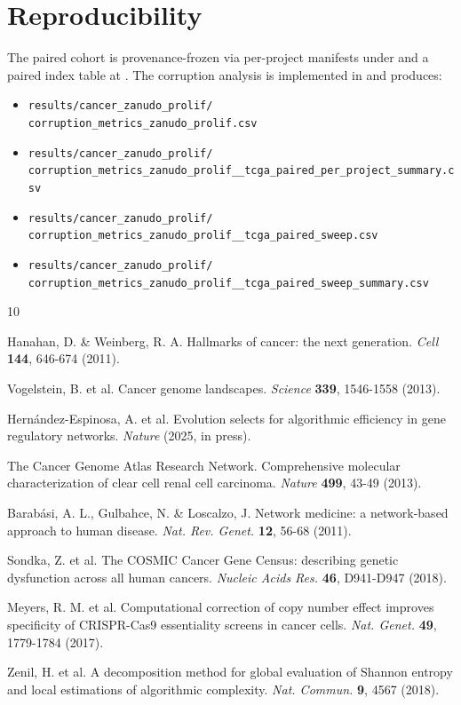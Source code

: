 \documentclass[11pt]{article}
\begin{document}
\section*{Reproducibility}

The paired cohort is provenance-frozen via per-project manifests under  and a paired index table at . The corruption analysis is implemented in  and produces:
\begin{itemize}
    \item \texttt{results/cancer\_zanudo\_prolif/}\\\texttt{corruption\_metrics\_zanudo\_prolif.csv}
    \item \texttt{results/cancer\_zanudo\_prolif/}\\\texttt{corruption\_metrics\_zanudo\_prolif\_\_tcga\_paired\_per\_project\_summary.csv}
    \item \texttt{results/cancer\_zanudo\_prolif/}\\\texttt{corruption\_metrics\_zanudo\_prolif\_\_tcga\_paired\_sweep.csv}
    \item \texttt{results/cancer\_zanudo\_prolif/}\\\texttt{corruption\_metrics\_zanudo\_prolif\_\_tcga\_paired\_sweep\_summary.csv}
\end{itemize}

\begin{thebibliography}{10}

Hanahan, D. \& Weinberg, R. A.
Hallmarks of cancer: the next generation.
\textit{Cell} \textbf{144}, 646-674 (2011).

Vogelstein, B. et al.
Cancer genome landscapes.
\textit{Science} \textbf{339}, 1546-1558 (2013).

Hernández-Espinosa, A. et al.
Evolution selects for algorithmic efficiency in gene regulatory networks.
\textit{Nature} (2025, in press).

The Cancer Genome Atlas Research Network.
Comprehensive molecular characterization of clear cell renal cell carcinoma.
\textit{Nature} \textbf{499}, 43-49 (2013).

Barabási, A. L., Gulbahce, N. \& Loscalzo, J.
Network medicine: a network-based approach to human disease.
\textit{Nat. Rev. Genet.} \textbf{12}, 56-68 (2011).

Sondka, Z. et al.
The COSMIC Cancer Gene Census: describing genetic dysfunction across all human cancers.
\textit{Nucleic Acids Res.} \textbf{46}, D941-D947 (2018).

Meyers, R. M. et al.
Computational correction of copy number effect improves specificity of CRISPR-Cas9 essentiality screens in cancer cells.
\textit{Nat. Genet.} \textbf{49}, 1779-1784 (2017).

Zenil, H. et al.
A decomposition method for global evaluation of Shannon entropy and local estimations of algorithmic complexity.
\textit{Nat. Commun.} \textbf{9}, 4567 (2018).

\end{thebibliography}
\end{document}
